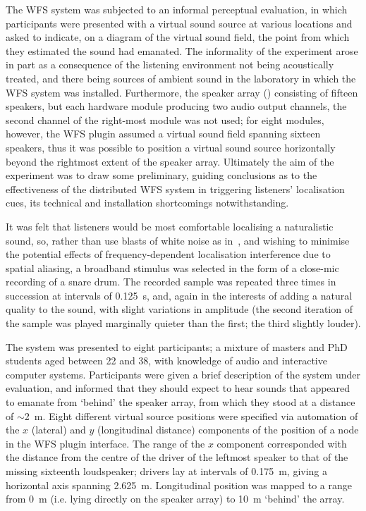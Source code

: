 The WFS system was subjected to an informal perceptual evaluation, in which
participants were presented with a virtual sound source at various locations
and asked to indicate, on a diagram of the virtual sound field, the point
from which they estimated the sound had emanated.
The informality of the experiment arose in part as a consequence of the
listening environment not being acoustically treated, and there being sources
of ambient sound in the laboratory in which the WFS system was installed.
Furthermore, the speaker array () consisting of fifteen
speakers, but each hardware module producing two audio output channels,
the second channel of the right-most module was not used;
for eight modules, however, the WFS plugin assumed a virtual sound field
spanning sixteen speakers, thus it was possible to position a virtual sound
source horizontally beyond the rightmost extent of the speaker array.
Ultimately the aim of the experiment was to draw some preliminary, guiding
conclusions as to the effectiveness of the distributed WFS system in
triggering listeners' localisation cues, its technical and installation
shortcomings notwithstanding.

It was felt that listeners would be most comfortable localising a naturalistic
sound, so, rather than use blasts of white noise as
in~\citep[ch.~6]{verheijen_sound_1998}, and wishing to minimise the potential
effects of frequency-dependent localisation interference due to spatial
aliasing, a broadband stimulus was selected in the form of a close-mic recording
of a snare drum.
The recorded sample was repeated three times in succession at intervals of
\qty{.125}{\s}, and, again in the interests of adding a natural quality to the
sound, with slight variations in amplitude (the second iteration of the sample
was played marginally quieter than the first; the third slightly louder).

The system was presented to eight participants; a mixture of  masters and PhD
students aged between 22 and 38, with knowledge of audio and interactive
computer systems.
Participants were given a brief description of the system under evaluation,
and informed that they should expect to hear sounds that appeared to emanate
from `behind' the speaker array, from which they stood at a distance of
$\sim$\qty{2}{\m}.
Eight different virtual source positions were specified via automation of the
$x$ (lateral) and $y$ (longitudinal distance) components of the position of a
node in the WFS plugin interface.
The range of the $x$ component corresponded with the distance from the centre of
the driver of the leftmost speaker to that of the missing sixteenth loudspeaker;
drivers lay at intervals of \qty{.175}{\m}, giving a horizontal axis spanning
\qty{2.625}{\m}.
Longitudinal position was mapped to a range from \qty{0}{\m} (i.e. lying
directly on the speaker array) to \qty{10}{\m} `behind' the array.

